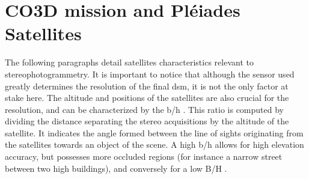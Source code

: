 \section{CO3D mission and Pléiades Satellites}
The following paragraphs detail satellites characteristics relevant to stereophotogrammetry. It is important to notice that although the sensor used greatly determines the resolution of the final \acrshort{dsm}, it is not the only factor at stake here. The altitude and positions of the satellites are also crucial for the resolution, and can be characterized by the \acrfull{b/h} . This ratio is computed by dividing the distance separating the stereo acquisitions by the altitude of the satellite. It indicates the angle formed between the line of sights originating from the satellites towards an object of the scene. A high \acrshort{b/h} allows for high elevation accuracy, but possesses more occluded regions (for instance a narrow street between two high buildings), and conversely for a low B/H \cite{delon_small_2007}.

